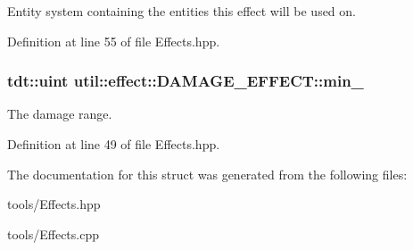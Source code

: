 Entity system containing the entities this effect will be used on. 



Definition at line 55 of file Effects.\+hpp.

\subsubsection[{\texorpdfstring{min\+\_\+}{min_}}]{\setlength{\rightskip}{0pt plus 5cm}tdt\+::uint util\+::effect\+::\+D\+A\+M\+A\+G\+E\+\_\+\+E\+F\+F\+E\+C\+T\+::min\+\_\+\hspace{0.3cm}{\ttfamily [private]}}\hypertarget{structutil_1_1effect_1_1_d_a_m_a_g_e___e_f_f_e_c_t_a294eef54f03197f6f26ea538daa84310}{}\label{structutil_1_1effect_1_1_d_a_m_a_g_e___e_f_f_e_c_t_a294eef54f03197f6f26ea538daa84310}


The damage range. 



Definition at line 49 of file Effects.\+hpp.



The documentation for this struct was generated from the following files\+:\begin{DoxyCompactItemize}
\item 
tools/Effects.\+hpp\item 
tools/Effects.\+cpp\end{DoxyCompactItemize}

